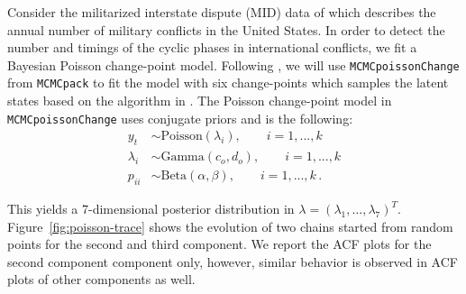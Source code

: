 \documentclass[11pt]{article}
\theoremstyle{remark}
\begin{document}
Consider the militarized interstate dispute (MID) data of \cite{martin2011mcmcpack} which describes the annual number of military conflicts in the United States. In order to detect the number and timings of the cyclic phases in international conflicts, we fit a Bayesian Poisson change-point model. Following \cite{martin2011mcmcpack}, we will use \texttt{MCMCpoissonChange} from \texttt{MCMCpack} to fit the model with six change-points which samples the latent states based on the algorithm in \cite{chib1998estimation}. The Poisson change-point model in \texttt{MCMCpoissonChange} uses conjugate priors and is the following:
%
\begin{align*}
    y_t &\sim \text{Poisson}(\lambda_i), \qquad i = 1, ..., k\\
    \lambda_i &\sim \text{Gamma}(c_o, d_o), \qquad i = 1,..., k\\
    p_{ii} &\sim \text{Beta}(\alpha, \beta), \qquad i = 1,..., k\,.
\end{align*}

This yields a 7-dimensional posterior distribution in $\lambda = (\lambda_1, \dots, \lambda_7)^T$. Figure~\ref{fig:poisson-trace} shows the evolution of two chains started from random points for the second and third component. We report the ACF plots for the second component component only, however, similar behavior is observed in ACF plots of other components as well.
\end{document}

